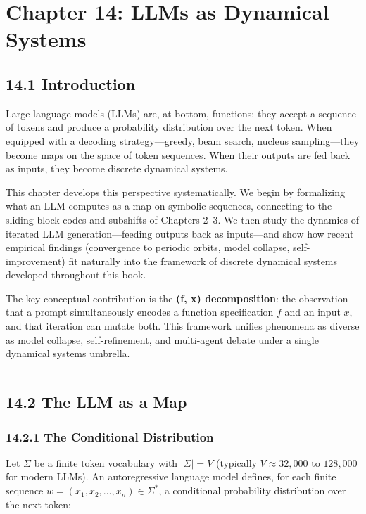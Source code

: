 \chapter{Chapter 14: LLMs as Dynamical Systems}

\section{14.1 Introduction}

Large language models (LLMs) are, at bottom, functions: they accept a sequence of tokens and produce a probability distribution over the next token. When equipped with a decoding strategy---greedy, beam search, nucleus sampling---they become maps on the space of token sequences. When their outputs are fed back as inputs, they become discrete dynamical systems.

This chapter develops this perspective systematically. We begin by formalizing what an LLM computes as a map on symbolic sequences, connecting to the sliding block codes and subshifts of Chapters 2--3. We then study the dynamics of iterated LLM generation---feeding outputs back as inputs---and show how recent empirical findings (convergence to periodic orbits, model collapse, self-improvement) fit naturally into the framework of discrete dynamical systems developed throughout this book.

The key conceptual contribution is the \textbf{(f, x) decomposition}: the observation that a prompt simultaneously encodes a function specification $f$ and an input $x$, and that iteration can mutate both. This framework unifies phenomena as diverse as model collapse, self-refinement, and multi-agent debate under a single dynamical systems umbrella.

\bigskip\hrule\bigskip

\section{14.2 The LLM as a Map}

\subsection{14.2.1 The Conditional Distribution}

Let $\Sigma$ be a finite token vocabulary with $|\Sigma| = V$ (typically $V \approx 32{,}000$ to $128{,}000$ for modern LLMs). An autoregressive language model defines, for each finite sequence $w = (x_1, x_2, \ldots, x_n) \in \Sigma^*$, a conditional probability distribution over the next token:

